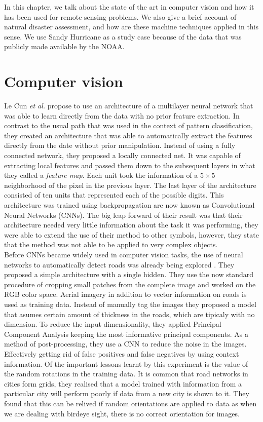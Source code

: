 In this chapter, we talk about the state of the art in computer vision and how it has been used for remote sensing problems. We also give a brief account of natural disaster assessment, and how are these machine techniques applied in this sense. We use Sandy Hurricane as a study case because of the data that was publicly made available by the NOAA.\\

\section{Computer vision}

Le Cun \textit{et al.} \cite{119325} propose to use an architecture of a multilayer neural network that was able to learn directly from the data with no prior feature extraction. In contrast to the usual path that was used in the context of pattern classification, they created an architecture that was able to automatically extract the features directly from the date without prior manipulation. Instead of using a fully connected network, they proposed a locally connected net. It was capable of extracting local features and passed them down to the subsequent layers in what they called a \textit{feature map}. Each unit took the information of a $5\times 5$ neighborhood of the pixel in the previous layer. The last layer of the architecture consisted of ten units that represented each of the possible digits. This architecture was trained using backpropagation are now known as Convolutional Neural Networks (CNNs). The big leap forward of their result was that their architecture needed very little information about the task it was performing, they were able to extend the use of their method to other symbols, however, they state that the method was not able to be applied to very complex objects.\\

Before CNNs became widely used in computer vision tasks, the use of neural networks to automatically detect roads was already being explored \cite{Mnih:2010:LDR:1888212.1888230}. They proposed a simple architecture with a single hidden. They use the now standard procedure of cropping small patches from the complete image and worked on the RGB color space. Aerial imagery in addition to vector information on roads is used as training data. Instead of manually tag the images they proposed a model that asumes certain amount of thickness in the roads, which are tipicaly with no dimension. To reduce the input dimensionality, they applied Principal Component Analysis keeping the most informative principal components. As a method of post-processing, they use a CNN to reduce the noise in the images. Effectively getting rid of false positives and false negatives by using context information. Of the important lessons learnt by this experiment is the value of the random rotations in the training data. It is common that road networks in cities form grids, they realised that a model trained with information from a particular city will perform poorly if data from a new city is shown to it. They found that this can be relived if random orientations are applied to data as when we are dealing with birdeye sight, there is no correct orientation for images.

